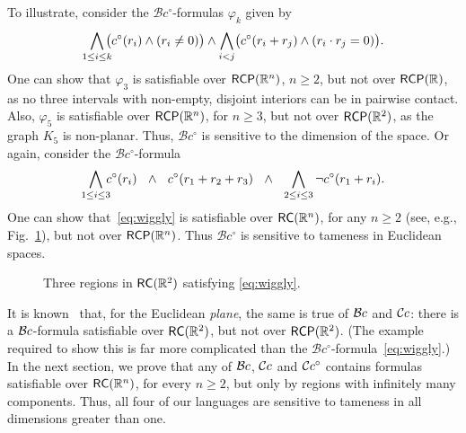 \documentclass{article}
\newcommand{\ic}{c^\circ}
\newcommand{\cBci}{\ensuremath{\mathcal{B}c^\circ}}
\newcommand{\R}{\mathbb{R}}
\newcommand{\RC}{{\sf RC}}
\newcommand{\RCP}{{\sf RCP}}
\renewcommand{\phi}{\varphi}
\begin{document}
To illustrate, consider the $\cBci$-formulas $\phi_k$
given by
\begin{equation}
\bigwedge_{1 \leq i \leq k}\hspace*{-0.5em}  \bigl( \ic(r_i) \land (r_i \neq 0) \bigr)
   \land \bigwedge_{i < j} \bigl( \ic(r_i + r_j) \land (r_i \cdot r_j =0) \bigr).
\label{eq:ex1}
\end{equation}
One can show that $\phi_3$ is satisfiable over $\RCP(\R^n)$, $n \geq
2$, but not over $\RCP(\R)$, as no three intervals with non-empty,
disjoint interiors can be in pairwise contact. Also, $\phi_5$ is
satisfiable over $\RCP(\R^n)$, for $n\geq 3$, but not over
$\RCP(\R^2)$, as the graph $K_5$ is non-planar.  Thus, $\cBci$ is
sensitive to the dimension of the space.
Or again, consider the $\cBci$-formula 
\begin{equation}\label{eq:wiggly}
\bigwedge_{1 \leq i \leq 3}\hspace*{-0.5em} \ic(r_i) \ \ \land\ \ \ic(r_1 + r_2 + r_3) \ \ \land\ \ \bigwedge_{2 \leq i \leq 3} \neg\ic(r_1 + r_i).
\end{equation}
One can show that~\eqref{eq:wiggly} is satisfiable over $\RC(\R^n)$,
for any $n\ge 2$ (see, e.g., Fig.~\ref{fig:wiggly}), but not over
$\RCP(\R^n)$. Thus $\cBci$ is sensitive to tameness in Euclidean
spaces.
\begin{figure}[ht]
\begin{center}
\end{center}\vspace*{-3mm}
\caption{Three regions in $\RC(\R^2)$ satisfying \eqref{eq:wiggly}.}
\label{fig:wiggly}
\end{figure}
It is known~\cite{ijcai:kphz10} that, for the Euclidean {\em plane},
the same is true of $\mathcal{B}c$ and $\mathcal{C}c$: there is a $\mathcal{B}c$-formula
satisfiable over $\RC(\R^2)$, but not over $\RCP(\R^2)$. (The 
example required to show this is far more complicated than the
\cBci-formula~\eqref{eq:wiggly}.)  In the next section, we prove that
any of $\mathcal{B}c$, $\mathcal{C}c$ and $\mathcal{C}c^\circ$ contains formulas satisfiable
over $\RC(\R^n)$, for every $n \geq 2$, but only by regions with
infinitely many components. Thus, all four of our languages are
sensitive to tameness in all dimensions greater than one.
\end{document}
